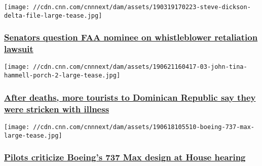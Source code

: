 \href{/2019/06/26/politics/stephen-dickson-faa-nominee-whistleblower-case/index.html}{}

\texttt{[image: //cdn.cnn.com/cnnnext/dam/assets/190319170223-steve-dickson-delta-file-large-tease.jpg]}

\hypertarget{senators-question-faa-nominee-on-whistleblower-retaliation-lawsuit}{%
\subsubsection{\texorpdfstring{\href{/2019/06/26/politics/stephen-dickson-faa-nominee-whistleblower-case/index.html}{Senators
question FAA nominee on whistleblower retaliation
lawsuit}}{Senators question FAA nominee on whistleblower retaliation lawsuit}}\label{senators-question-faa-nominee-on-whistleblower-retaliation-lawsuit}}

\href{/2019/06/24/health/dominican-republic-sickness-deaths-invs/index.html}{}

\texttt{[image: //cdn.cnn.com/cnnnext/dam/assets/190621160417-03-john-tina-hammell-porch-2-large-tease.jpg]}

\hypertarget{after-deaths-more-tourists-to-dominican-republic-say-they-were-stricken-with-illness-}{%
\subsubsection{\texorpdfstring{\href{/2019/06/24/health/dominican-republic-sickness-deaths-invs/index.html}{After
deaths, more tourists to Dominican Republic say they were stricken with
illness
}}{After deaths, more tourists to Dominican Republic say they were stricken with illness }}\label{after-deaths-more-tourists-to-dominican-republic-say-they-were-stricken-with-illness-}}

\href{/2019/06/19/politics/boeing-737-max-plane-house-hearing/index.html}{}

\texttt{[image: //cdn.cnn.com/cnnnext/dam/assets/190618105510-boeing-737-max-large-tease.jpg]}

\hypertarget{pilots-criticize-boeings-737-max-design-at-house-hearing}{%
\subsubsection{\texorpdfstring{\href{/2019/06/19/politics/boeing-737-max-plane-house-hearing/index.html}{Pilots
criticize Boeing's 737 Max design at House
hearing}}{Pilots criticize Boeing's 737 Max design at House hearing}}\label{pilots-criticize-boeings-737-max-design-at-house-hearing}}


